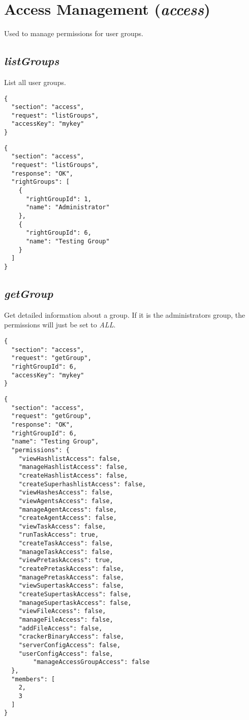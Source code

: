 \section*{Access Management (\textit{access})}
	Used to manage permissions for user groups.

\subsection*{\textit{listGroups}}
	List all user groups.
	{
		\color{blue}
		\begin{verbatim}
{
  "section": "access",
  "request": "listGroups",
  "accessKey": "mykey"
}
		\end{verbatim}
	}
	{
		\color{OliveGreen}
		\begin{verbatim}
{
  "section": "access",
  "request": "listGroups",
  "response": "OK",
  "rightGroups": [
    {
      "rightGroupId": 1,
      "name": "Administrator"
    },
    {
      "rightGroupId": 6,
      "name": "Testing Group"
    }
  ]
}
		\end{verbatim}
	}
\subsection*{\textit{getGroup}}
	Get detailed information about a group. If it is the administrators group, the permissions will just be set to \textit{ALL}.
	{
		\color{blue}
		\begin{verbatim}
{
  "section": "access",
  "request": "getGroup",
  "rightGroupId": 6,
  "accessKey": "mykey"
}
		\end{verbatim}
	}
	{
		\color{OliveGreen}
		\begin{verbatim}
{
  "section": "access",
  "request": "getGroup",
  "response": "OK",
  "rightGroupId": 6,
  "name": "Testing Group",
  "permissions": {
    "viewHashlistAccess": false,
    "manageHashlistAccess": false,
    "createHashlistAccess": false,
    "createSuperhashlistAccess": false,
    "viewHashesAccess": false,
    "viewAgentsAccess": false,
    "manageAgentAccess": false,
    "createAgentAccess": false,
    "viewTaskAccess": false,
    "runTaskAccess": true,
    "createTaskAccess": false,
    "manageTaskAccess": false,
    "viewPretaskAccess": true,
    "createPretaskAccess": false,
    "managePretaskAccess": false,
    "viewSupertaskAccess": false,
    "createSupertaskAccess": false,
    "manageSupertaskAccess": false,
    "viewFileAccess": false,
    "manageFileAccess": false,
    "addFileAccess": false,
    "crackerBinaryAccess": false,
    "serverConfigAccess": false,
    "userConfigAccess": false,
		"manageAccessGroupAccess": false
  },
  "members": [
    2,
    3
  ]
}
		\end{verbatim}
	}
